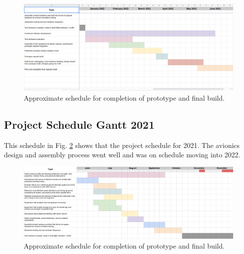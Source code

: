 \documentclass{article}
\begin{document}
\begin{landscape}
\label{app-schedule-22}
\begin{figure}[H]
	\centering
	\includegraphics[width=1.25\textwidth]{images/schedule-22.png}
	\caption{Approximate schedule for completion of prototype and final build.}
	\label{fig:schedule22}
\end{figure}

\end{landscape}
\restoregeometry




\begin{landscape}
\section{Project Schedule Gantt 2021}
\label{app-schedule-21}
This schedule in Fig. \ref{fig:schedule} shows that the project schedule for 2021. The avionics design and assembly process went well and was on schedule moving into 2022.
\begin{figure}[H]
	\centering
	\includegraphics[width=1.25\textwidth]{images/schedule.png}
	\caption{Approximate schedule for completion of prototype and final build.}
	\label{fig:schedule}
\end{figure}
\end{landscape}
\restoregeometry

%
%
\end{document}
